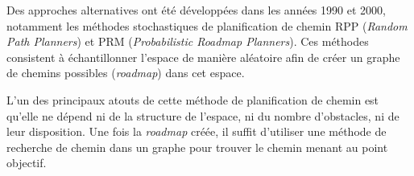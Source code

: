 \documentclass[main.tex]{subfiles}
\begin{document}
Des approches alternatives ont été développées dans les années 1990 et 2000, notamment les méthodes stochastiques de planification de chemin RPP (\textit{Random Path Planners}) et PRM (\textit{Probabilistic Roadmap Planners}). Ces méthodes consistent à échantillonner l'espace de manière aléatoire afin de créer un graphe de chemins possibles (\textit{roadmap}) dans cet espace.\cite{amato_1996,hsu_2002,nissoux_1999}  

L'un des principaux atouts de cette méthode de planification de chemin est qu'elle ne dépend ni de la structure de l'espace, ni du nombre d'obstacles, ni de leur disposition. Une fois la \textit{roadmap} créée, il suffit d'utiliser une méthode de recherche de chemin dans un graphe pour trouver le chemin menant au point objectif.\cite{gasparetto_2015}
\end{document}
